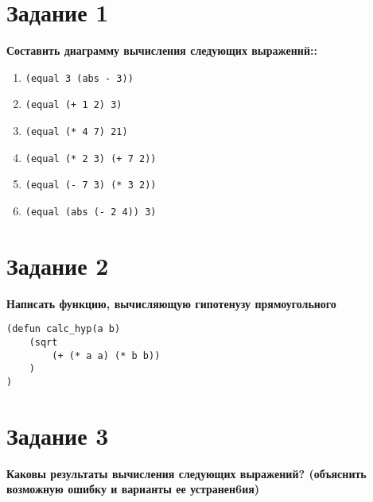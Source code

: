 \documentclass[a4paper,14pt, unknownkeysallowed]{extreport}
\begin{document}


\section*{Задание 1}

\textbf{Составить диаграмму вычисления следующих выражений::}
\begin{enumerate}[label=\arabic*)]
	\item \lstinline {(equal 3 (abs - 3))}
	\item \lstinline {(equal (+ 1 2) 3)}
	\item \lstinline {(equal (* 4 7) 21)}
	\item \lstinline {(equal (* 2 3) (+ 7 2))}
	\item \lstinline {(equal (- 7 3) (* 3 2))}
	\item \lstinline {(equal (abs (- 2 4)) 3)}
	
\end{enumerate}

\clearpage

\section*{Задание 2}

\textbf{Написать функцию, вычисляющую гипотенузу прямоугольного}

\begin{lstlisting}
(defun calc_hyp(a b)
	(sqrt
		(+ (* a a) (* b b))
	)
)
\end{lstlisting}

\section*{Задание 3}

\textbf{Каковы результаты вычисления следующих выражений?
	(объяснить возможную ошибку и варианты ее устранен6ия)}
\end{document}
